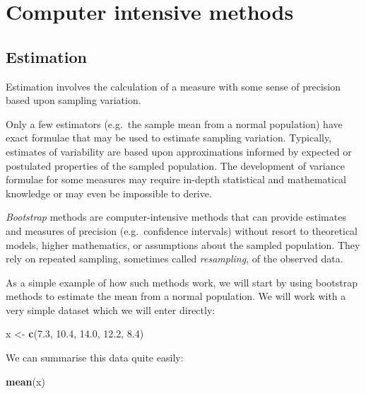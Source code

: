 \documentclass[12pt,a4paper]{book}
\newenvironment{Shaded}{\begin{snugshade}}{\end{snugshade}}
\newcommand{\KeywordTok}[1]{\textcolor[rgb]{0.13,0.29,0.53}{\textbf{#1}}}
\newcommand{\FloatTok}[1]{\textcolor[rgb]{0.00,0.00,0.81}{#1}}
\newcommand{\StringTok}[1]{\textcolor[rgb]{0.31,0.60,0.02}{#1}}
\newcommand{\NormalTok}[1]{#1}
\theoremstyle{definition}
\theoremstyle{definition}
\theoremstyle{definition}
\theoremstyle{remark}
\begin{document}
\hypertarget{exercise9}{%
\chapter{Computer intensive methods}\label{exercise9}}

\hypertarget{estimation}{%
\section{Estimation}\label{estimation}}

Estimation involves the calculation of a measure with some sense of
precision based upon sampling variation.

Only a few estimators (e.g.~the sample mean from a normal population)
have exact formulae that may be used to estimate sampling variation.
Typically, estimates of variability are based upon approximations
informed by expected or postulated properties of the sampled population.
The development of variance formulae for some measures may require
in-depth statistical and mathematical knowledge or may even be
impossible to derive.

\emph{Bootstrap} methods are computer-intensive methods that can provide
estimates and measures of precision (e.g.~confidence intervals) without
resort to theoretical models, higher mathematics, or assumptions about
the sampled population. They rely on repeated sampling, sometimes called
\emph{resampling}, of the observed data.

As a simple example of how such methods work, we will start by using
bootstrap methods to estimate the mean from a normal population. We will
work with a very simple dataset which we will enter directly:

\begin{Shaded}
\begin{Highlighting}[]
\NormalTok{x <-}\StringTok{ }\KeywordTok{c}\NormalTok{(}\FloatTok{7.3}\NormalTok{, }\FloatTok{10.4}\NormalTok{, }\FloatTok{14.0}\NormalTok{, }\FloatTok{12.2}\NormalTok{, }\FloatTok{8.4}\NormalTok{)}
\end{Highlighting}
\end{Shaded}

We can summarise this data quite easily:

\begin{Shaded}
\begin{Highlighting}[]
\KeywordTok{mean}\NormalTok{(x)}
\end{Highlighting}
\end{Shaded}
\end{document}
